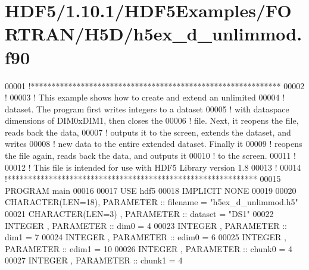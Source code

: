\hypertarget{_h_d_f5_21_810_81_2_h_d_f5_examples_2_f_o_r_t_r_a_n_2_h5_d_2h5ex__d__unlimmod_8f90_source}{}\section{H\+D\+F5/1.10.1/\+H\+D\+F5\+Examples/\+F\+O\+R\+T\+R\+A\+N/\+H5\+D/h5ex\+\_\+d\+\_\+unlimmod.f90}
\label{_h_d_f5_21_810_81_2_h_d_f5_examples_2_f_o_r_t_r_a_n_2_h5_d_2h5ex__d__unlimmod_8f90_source}

\begin{DoxyCode}
00001 \textcolor{comment}{!************************************************************}
00002 \textcolor{comment}{!}
00003 \textcolor{comment}{!  This example shows how to create and extend an unlimited}
00004 \textcolor{comment}{!  dataset.  The program first writes integers to a dataset}
00005 \textcolor{comment}{!  with dataspace dimensions of DIM0xDIM1, then closes the}
00006 \textcolor{comment}{!  file.  Next, it reopens the file, reads back the data,}
00007 \textcolor{comment}{!  outputs it to the screen, extends the dataset, and writes}
00008 \textcolor{comment}{!  new data to the entire extended dataset.  Finally it}
00009 \textcolor{comment}{!  reopens the file again, reads back the data, and outputs it}
00010 \textcolor{comment}{!  to the screen.}
00011 \textcolor{comment}{!}
00012 \textcolor{comment}{!  This file is intended for use with HDF5 Library version 1.8}
00013 \textcolor{comment}{!}
00014 \textcolor{comment}{!************************************************************}
00015 \textcolor{keyword}{PROGRAM} main
00016 
00017   \textcolor{keywordtype}{USE }hdf5
00018   \textcolor{keywordtype}{IMPLICIT NONE}
00019 
00020   \textcolor{keywordtype}{CHARACTER(LEN=18)}, \textcolor{keywordtype}{PARAMETER} :: filename = \textcolor{stringliteral}{"h5ex\_d\_unlimmod.h5"}
00021   \textcolor{keywordtype}{CHARACTER(LEN=3)} , \textcolor{keywordtype}{PARAMETER} :: dataset  = \textcolor{stringliteral}{"DS1"}
00022   \textcolor{keywordtype}{INTEGER}          , \textcolor{keywordtype}{PARAMETER} :: dim0     = 4
00023   \textcolor{keywordtype}{INTEGER}          , \textcolor{keywordtype}{PARAMETER} :: dim1     = 7
00024   \textcolor{keywordtype}{INTEGER}          , \textcolor{keywordtype}{PARAMETER} :: edim0    = 6
00025   \textcolor{keywordtype}{INTEGER}          , \textcolor{keywordtype}{PARAMETER} :: edim1    = 10
00026   \textcolor{keywordtype}{INTEGER}          , \textcolor{keywordtype}{PARAMETER} :: chunk0   = 4
00027   \textcolor{keywordtype}{INTEGER}          , \textcolor{keywordtype}{PARAMETER} :: chunk1   = 4

\end{DoxyCode}
